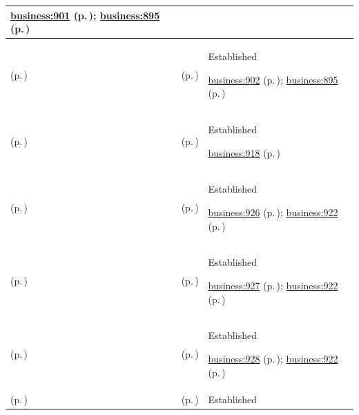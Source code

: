 \begin{longtable}{|>{\raggedright\arraybackslash}p{0.27\TableWidth}|>{\raggedright\arraybackslash}p{0.27\TableWidth}|>{\raggedright\arraybackslash}p{0.46\TableWidth}|}
 \hyperref[rad:business:897]{business:901} (p.\,\pageref{rad:business:897}); \hyperref[rad:business:895]{business:895} (p.\,\pageref{rad:business:895})\\\hline
\nameref{cap:bc-health-service-alignment} (p.\,\pageref{cap:bc-health-service-alignment}) & \nameref{cap:bc-health-service-implementation-planning} (p.\,\pageref{cap:bc-health-service-implementation-planning}) & Established

 \hyperref[rad:business:897]{business:902} (p.\,\pageref{rad:business:897}); \hyperref[rad:business:895]{business:895} (p.\,\pageref{rad:business:895})\\\hline
\nameref{cap:bc-workforce-organisational-capability} (p.\,\pageref{cap:bc-workforce-organisational-capability}) & \nameref{cap:bc-health-workforce-management} (p.\,\pageref{cap:bc-health-workforce-management}) & Established

 \hyperref[rad:business:918]{business:918} (p.\,\pageref{rad:business:918})\\\hline
\nameref{cap:bc-health-workforce-management} (p.\,\pageref{cap:bc-health-workforce-management}) & \nameref{cap:bc-practitioner-qualification-management} (p.\,\pageref{cap:bc-practitioner-qualification-management}) & Established

 \hyperref[rad:business:924]{business:926} (p.\,\pageref{rad:business:924}); \hyperref[rad:business:922]{business:922} (p.\,\pageref{rad:business:922})\\\hline
\nameref{cap:bc-health-workforce-management} (p.\,\pageref{cap:bc-health-workforce-management}) & \nameref{cap:bc-practitioner-engagement-privilege-management} (p.\,\pageref{cap:bc-practitioner-engagement-privilege-management}) & Established

 \hyperref[rad:business:924]{business:927} (p.\,\pageref{rad:business:924}); \hyperref[rad:business:922]{business:922} (p.\,\pageref{rad:business:922})\\\hline
\nameref{cap:bc-health-workforce-management} (p.\,\pageref{cap:bc-health-workforce-management}) & \nameref{cap:bc-workforce-service-coverage-management} (p.\,\pageref{cap:bc-workforce-service-coverage-management}) & Established

 \hyperref[rad:business:924]{business:928} (p.\,\pageref{rad:business:924}); \hyperref[rad:business:922]{business:922} (p.\,\pageref{rad:business:922})\\\hline
\nameref{cap:bc-workforce-organisational-capability} (p.\,\pageref{cap:bc-workforce-organisational-capability}) & \nameref{cap:bc-healthcare-organisation-service-structure-management} (p.\,\pageref{cap:bc-healthcare-organisation-service-structure-management}) & Established


\end{longtable}

